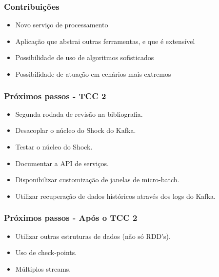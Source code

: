 \documentclass{beamer}
\begin{document}
  \begin{frame}
      \frametitle{Contribuições}
      \begin{itemize}
          \item Novo serviço de processamento
          \item Aplicação que abstrai outras ferramentas, e que é extensível
          \item Possibilidade de uso de algoritmos sofisticados
          \item Possibilidade de atuação em cenários mais extremos
      \end{itemize}
  \end{frame}

  \begin{frame}
      \frametitle{Próximos passos - TCC 2}
      \begin{itemize}
          \item Segunda rodada de revisão na bibliografia.
          \item Desacoplar o núcleo do Shock do Kafka.
          \item Testar o núcleo do Shock.
          \item Documentar a API de serviços.
          \item Disponibilizar customização de janelas de micro-batch.
          \item Utilizar recuperação de dados históricos através dos logs do Kafka.
      \end{itemize}
  \end{frame}

  \begin{frame}
      \frametitle{Próximos passos - Após o TCC 2}
      \begin{itemize}
          \item Utilizar outras estruturas de dados (não só RDD's).
          \item Uso de check-points.
          \item Múltiplos streams.
      \end{itemize}
  \end{frame}
\end{document}
